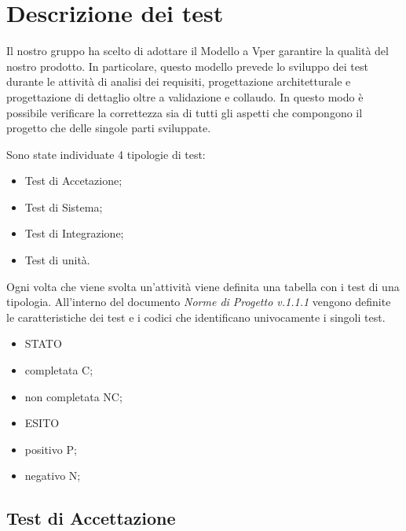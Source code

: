 \section{Descrizione dei test}
Il nostro gruppo ha scelto di adottare il Modello a V\glosp per garantire la qualità del nostro prodotto. In particolare, questo modello prevede lo sviluppo dei test durante le attività di analisi dei requisiti, progettazione architetturale e progettazione di dettaglio oltre a validazione e collaudo.
In questo modo è possibile verificare la correttezza sia di tutti gli aspetti che compongono il progetto che delle singole parti sviluppate.

Sono state individuate 4 tipologie di test:
\begin{itemize}
	\item Test di Accetazione;
	\item Test di Sistema;
	\item Test di Integrazione;
	\item Test di unità.
\end{itemize}
Ogni volta che viene svolta un'attività viene definita una tabella con i test di una tipologia.
All'interno del documento \textit{Norme di Progetto v.1.1.1} vengono definite le caratteristiche dei test e i codici che identificano univocamente i singoli test.

\begin{itemize}
	\item STATO
	\item completata C;
	\item non completata NC;
	\item ESITO
	\item positivo P;
	\item negativo N;
\end{itemize}

\subsection{Test di Accettazione}

